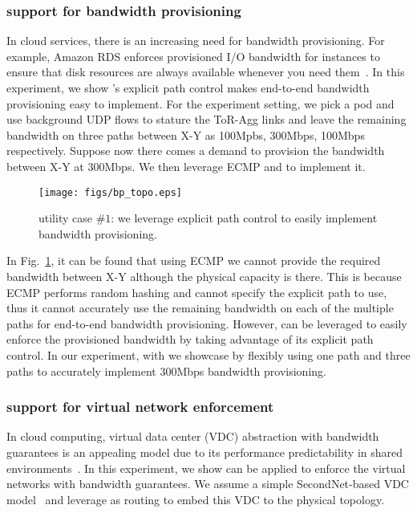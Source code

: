 \subsubsection{\sys support for bandwidth provisioning}

In cloud services, there is an increasing need for bandwidth provisioning. For example, Amazon RDS enforces provisioned I/O bandwidth for instances to ensure that disk resources are always available whenever you need them~\cite{privisionIO}. In this experiment, we show \sys's explicit path control makes end-to-end bandwidth provisioning easy to implement. For the experiment setting, we pick a pod and use background UDP flows to stature the ToR-Agg links and leave the remaining bandwidth on three paths between X-Y as 100Mpbs, 300Mbps, 100Mbps respectively. Suppose now there comes a demand to provision the bandwidth between X-Y at 300Mbps. We then leverage ECMP and \sys to implement it.

\begin{figure}[t]
\centering
\texttt{[image: figs/bp\_topo.eps]}
\caption{\sys utility case $\#1$: we leverage \sys explicit path control to easily implement bandwidth provisioning.}
\label{fig:bandwidth_provisioning}
\end{figure}

In Fig.~\ref{fig:bandwidth_provisioning}, it can be found that using ECMP we cannot provide the required bandwidth between X-Y although the physical capacity is there. This is because ECMP performs random hashing and cannot specify the explicit path to use, thus it cannot accurately use the remaining bandwidth on each of the multiple paths for end-to-end bandwidth provisioning. However, \sys can be leveraged to easily enforce the provisioned bandwidth by taking advantage of its explicit path control. In our experiment, with \sys we showcase by flexibly using one path and three paths to accurately implement 300Mbps bandwidth provisioning.

\subsubsection{\sys support for virtual network enforcement}

In cloud computing, virtual data center (VDC) abstraction with bandwidth guarantees is an appealing model due to its performance predictability in shared environments~\cite{secondnet,oktopus,proteus2012}. In this experiment, we show \sys can be applied to enforce the virtual networks with bandwidth guarantees. We assume a simple SecondNet-based VDC model~\cite{secondnet} and leverage \sys as routing to embed this VDC to the physical topology.


